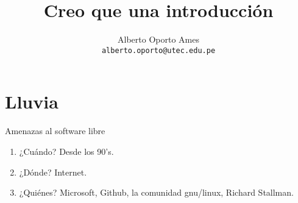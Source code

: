 \documentclass[12pt]{article}
\title{\textbf{Creo que una introducción}}
\author{
		Alberto Oporto Ames\\
		\texttt{alberto.oporto@utec.edu.pe}
		}
\begin{document}
\maketitle
\thispagestyle{fancy}

\section{Lluvia}%
\label{sec:Lluvia}

Amenazas al software libre

\begin{enumerate}
	\item ¿Cuándo?
		\subitem Desde los 90's.
	\item ¿Dónde?
		\subitem Internet.
	\item ¿Quiénes?
		\subitem Microsoft, Github, la comunidad gnu/linux, Richard Stallman.
\end{enumerate}
\end{document}
